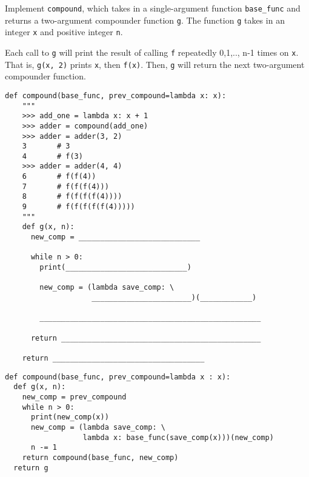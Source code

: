 
\begin{blocksection}
\question Implement \texttt{compound}, which takes in a single-argument function \texttt{base\_func} and returns a two-argument compounder function \texttt{g}. The function \texttt{g} takes in an integer \texttt{x} and positive integer \texttt{n}.

Each call to \texttt{g} will print the result of calling \texttt{f} repeatedly 0,1,.., n-1 times on \texttt{x}. That is, \texttt{g(x, 2)} prints \texttt{x}, then \texttt{f(x)}. Then, \texttt{g} will return the next two-argument compounder function.

\begin{lstlisting}
def compound(base_func, prev_compound=lambda x: x):
    """
    >>> add_one = lambda x: x + 1
    >>> adder = compound(add_one)
    >>> adder = adder(3, 2)
    3       # 3
    4       # f(3)
    >>> adder = adder(4, 4)
    6       # f(f(4))
    7       # f(f(f(4)))
    8       # f(f(f(f(4))))
    9       # f(f(f(f(f(4)))))
    """
    def g(x, n):
      new_comp = ____________________________

      while n > 0:
        print(____________________________)

        new_comp = (lambda save_comp: \
                    _______________________)(____________)

        ___________________________________________________

      return ______________________________________________
      
    return ___________________________________  
\end{lstlisting}

\begin{solution}[1in]
\begin{lstlisting}
def compound(base_func, prev_compound=lambda x : x):
  def g(x, n):
    new_comp = prev_compound
    while n > 0:
      print(new_comp(x))
      new_comp = (lambda save_comp: \
                  lambda x: base_func(save_comp(x)))(new_comp)
      n -= 1
    return compound(base_func, new_comp)
  return g
\end{lstlisting}
\end{solution}
\end{blocksection}